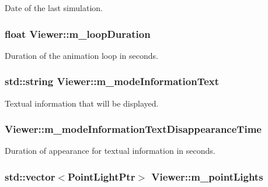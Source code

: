 Date of the last simulation. \hypertarget{classViewer_a361b307d72d4647b895b0c35d6b3a3a9}{
\subsubsection[{m\+\_\+loop\+Duration}]{\setlength{\rightskip}{0pt plus 5cm}float Viewer\+::m\+\_\+loop\+Duration\hspace{0.3cm}{\ttfamily [private]}}}\label{classViewer_a361b307d72d4647b895b0c35d6b3a3a9}
Duration of the animation loop in seconds. \hypertarget{classViewer_addd1668ee49c52296c2d13a15d2a8f6c}{
\subsubsection[{m\+\_\+mode\+Information\+Text}]{\setlength{\rightskip}{0pt plus 5cm}std\+::string Viewer\+::m\+\_\+mode\+Information\+Text\hspace{0.3cm}{\ttfamily [private]}}}\label{classViewer_addd1668ee49c52296c2d13a15d2a8f6c}
Textual information that will be displayed. \hypertarget{classViewer_a36cbb2fc59ec195458a2982d335edc9f}{
\subsubsection[{m\+\_\+mode\+Information\+Text\+Disappearance\+Time}]{ Viewer\+::m\+\_\+mode\+Information\+Text\+Disappearance\+Time\hspace{0.3cm}{\ttfamily [private]}}}\label{classViewer_a36cbb2fc59ec195458a2982d335edc9f}
Duration of appearance for textual information in seconds. \hypertarget{classViewer_a0839a4bd3c220aa6e50d9c3d304e68ee}{
\subsubsection[{m\+\_\+point\+Lights}]{\setlength{\rightskip}{0pt plus 5cm}std\+::vector$<${\bf Point\+Light\+Ptr}$>$ Viewer\+::m\+\_\+point\+Lights\hspace{0.3cm}{\ttfamily [private]}}}\label{classViewer_a0839a4bd3c220aa6e50d9c3d304e68ee}
